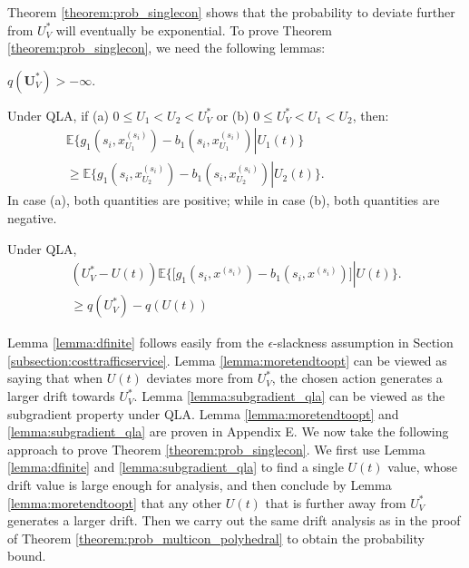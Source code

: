 \documentclass[journal]{IEEEtran}
\newcommand{\expect}[1]{\mathbb{E}\big\{#1\big\}}
\newcommand{\bv}[1]{{\boldsymbol{#1} }}
\begin{document}
Theorem \ref{theorem:prob_singlecon} shows that the probability to deviate further from $U^*_V$ will eventually be exponential. To prove Theorem \ref{theorem:prob_singlecon}, we need the following lemmas: 
\begin{lemma}\label{lemma:dfinite}
$q(\bv{U}^*_V)>-\infty$. %
\end{lemma}
\begin{lemma}\label{lemma:moretendtoopt}
Under QLA, if (a) $0\leq U_1<U_2<U_V^*$ or (b) $0\leq U_V^*<U_1<U_2$, then:
\begin{eqnarray*}
\expect{g_{1}(s_i, x^{(s_i)}_{U_1})-b_{1}(s_i, x^{(s_i)}_{U_1})\left|\right.U_1(t)}\qquad\qquad\qquad\qquad\\
\geq\expect{ g_{1}(s_i, x^{(s_i)}_{U_2})-b_{1}(s_i, x^{(s_i)}_{U_2})\left|\right.U_2(t)}.
\end{eqnarray*}
In case (a), both quantities are positive; while in case (b), both quantities are negative. 
\end{lemma}
\begin{lemma}\label{lemma:subgradient_qla}
Under QLA,
\begin{eqnarray}
(U_{V}^*-U(t))\expect{\big[g_1(s_i, x^{(s_i)})-b_1(s_i, x^{(s_i)})\big]\left|\right. U(t)}.\label{eq:qla_osm_relation}\\
\geq q(U^*_V)-q(U(t))\nonumber
\end{eqnarray}
\end{lemma}

Lemma \ref{lemma:dfinite} follows  easily from the $\epsilon$-slackness assumption in Section \ref{subsection:costtrafficservice}. 
Lemma \ref{lemma:moretendtoopt} can be viewed as saying that when $U(t)$ deviates more from $U^*_V$, the chosen action generates a larger drift  towards $U^*_V$. Lemma \ref{lemma:subgradient_qla} can be viewed as the subgradient property under QLA. Lemma \ref{lemma:moretendtoopt} and \ref{lemma:subgradient_qla} are proven in Appendix E. We now take the following approach to prove Theorem \ref{theorem:prob_singlecon}. We first use Lemma \ref{lemma:dfinite} and \ref{lemma:subgradient_qla} to find a single $U(t)$ value, whose drift value is large enough for analysis, and then conclude by Lemma  \ref{lemma:moretendtoopt} that any other $U(t)$ that is further away from $U^*_V$ generates a larger drift. Then we carry out the same drift analysis as in the proof of Theorem \ref{theorem:prob_multicon_polyhedral} to obtain the probability bound. 
\end{document}

